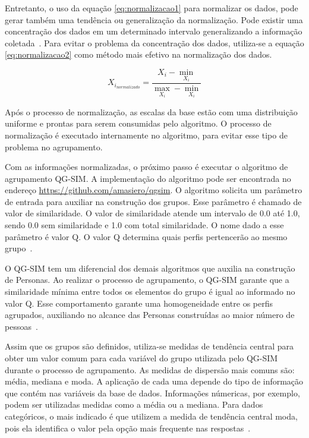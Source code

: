 Entretanto, o uso da equação \ref{eq:normalizacao1} para normalizar os dados, pode gerar também uma tendência ou generalização da normalização. Pode existir uma concentração dos dados em um determinado intervalo generalizando a informação coletada~\cite{masiero:2013, masiero:2013a, masiero:2013b}. Para evitar o problema da concentração dos dados, utiliza-se a equação \ref{eq:normalizacao2} como método mais efetivo na normalização dos dados.

\begin{equation}
	X_{i_{normalizado}} = \frac{X_i - \min_{X_i}}{\max_{X_i} - \min_{X_i}}
	\label{eq:normalizacao2}
\end{equation}

Após o processo de normalização, as escalas da base estão com uma distribuição uniforme e prontas para serem consumidas pelo algoritmo. O processo de normalização é executado internamente no algoritmo, para evitar esse tipo de problema no agrupamento.

Com as informações normalizadas, o próximo passo é executar o algoritmo de agrupamento QG-SIM. A implementação do algoritmo pode ser encontrada no endereço \url{https://github.com/amasiero/qgsim}. O algoritmo solicita um parâmetro de entrada para auxiliar na construção dos grupos. Esse parâmetro é chamado de valor de similaridade. O valor de similaridade atende um intervalo de 0.0 até 1.0, sendo 0.0 sem similaridade e 1.0 com total similaridade. O nome dado a esse parâmetro é valor Q. O valor Q determina quais perfis pertencerão ao mesmo grupo~\cite{masiero:2013}.

O QG-SIM tem um diferencial dos demais algoritmos que auxilia na construção de Personas. Ao realizar o processo de agrupamento, o QG-SIM garante que a similaridade mínima entre todos os elementos do grupo é igual ao informado no valor Q. Esse comportamento garante uma homogeneidade entre os perfis agrupados, auxiliando no alcance das Personas construídas ao maior número de pessoas~\cite{masiero:2013, masiero:2013a}.

Assim que os grupos são definidos, utiliza-se medidas de tendência central para obter um valor comum para cada variável do grupo utilizada pelo QG-SIM durante o processo de agrupamento. As medidas de dispersão mais comuns são: média, mediana e moda. A aplicação de cada uma depende do tipo de informação que contém nas variáveis da base de dados. Informações númericas, por exemplo, podem ser utilizadas medidas como a média ou a mediana. Para dados categóricos, o mais indicado é que utilizem a medida de tendência central moda, pois ela identifica o valor pela opção mais frequente nas respostas~\cite{masiero:2011, masiero:2013a, masiero:2013b}.

